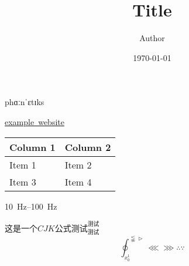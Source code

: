 \documentclass{article}
\title{Title}
\author{Author}
\date{\today}
\begin{document}
    \maketitle
    {\gentium phɑːnˈɛtɪks}
    
    \href{www.example.com}{example\ website}

    \begin{tabu} to 1\textwidth {X[2,l]X[1,r]}
        Column 1 & Column 2 \\
        \hline
        Item 1 & Item 2 \\
        Item 3 & Item 4 \\
    \end{tabu}

    \SIrange{10}{100}{\hertz}

    $这是一个CJK公式测试^{测试}_{测试}$
    \[\oint_{x_0^1}^{\lnapprox \vartriangleright}\lll \ggg \therefore \because  \]
\end{document}
